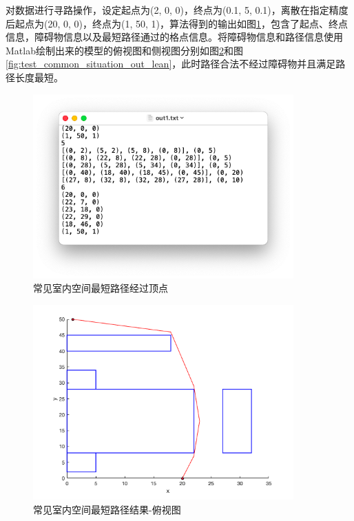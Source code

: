 对数据进行寻路操作，设定起点为(2, 0, 0)，终点为(0.1, 5, 0.1)，离散在指定精度后起点为(20, 0, 0)，终点为(1, 50, 1)，算法得到的输出如图\ref{fig:test_common_situation_out}，包含了起点、终点信息，障碍物信息以及最短路径通过的格点信息。将障碍物信息和路径信息使用Matlab绘制出来的模型的俯视图和侧视图分别如图\ref{fig:test_common_situation_out_top}和图\ref{fig:test_common_situation_out_lean}，此时路径合法不经过障碍物并且满足路径长度最短。
\begin{figure}[htb]
    \centering
    \caption{常见室内空间最短路径经过顶点}
    \label{fig:test_common_situation_out}
    \includegraphics[width=10cm]{figures/test_common_situation_out.png}
\end{figure}
\begin{figure}[htb]
    \centering
    \caption{常见室内空间最短路径结果-俯视图}
    \label{fig:test_common_situation_out_top}
    \includegraphics[width=10cm]{figures/test_common_situation_out_top.png}
\end{figure}
